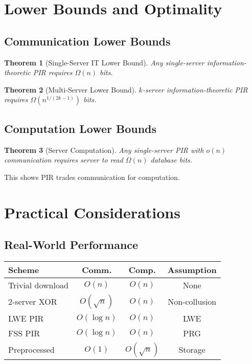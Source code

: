 \documentclass[11pt,final,hidelinks]{article}
\newtheorem{theorem}{Theorem}[section]
\begin{document}
\section{Lower Bounds and Optimality}

\subsection{Communication Lower Bounds}

\begin{theorem}[Single-Server IT Lower Bound]
Any single-server information-theoretic PIR requires $\Omega(n)$ bits.
\end{theorem}

\begin{theorem}[Multi-Server Lower Bound]
$k$-server information-theoretic PIR requires $\Omega(n^{1/(2k-1)})$ bits.
\end{theorem}

\subsection{Computation Lower Bounds}

\begin{theorem}[Server Computation]
Any single-server PIR with $o(n)$ communication requires server to read $\Omega(n)$ database bits.
\end{theorem}

This shows PIR trades communication for computation.

\section{Practical Considerations}

\subsection{Real-World Performance}

\begin{center}
\begin{tabular}{lccc}
\toprule
\textbf{Scheme} & \textbf{Comm.} & \textbf{Comp.} & \textbf{Assumption} \\
\midrule
Trivial download & $O(n)$ & $O(n)$ & None \\
2-server XOR & $O(\sqrt{n})$ & $O(n)$ & Non-collusion \\
LWE PIR & $O(\log n)$ & $O(n)$ & LWE \\
FSS PIR & $O(\log n)$ & $O(n)$ & PRG \\
Preprocessed & $O(1)$ & $O(\sqrt{n})$ & Storage \\
\bottomrule
\end{tabular}
\end{center}
\end{document}
